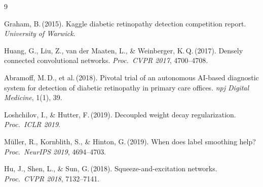 \documentclass[a4paper, 10pt, twocolumn]{article}
\begin{document}
\renewcommand{\refname}{\normalfont\bfseries\small\color{accent}References}
\begin{thebibliography}{9}
\small\setlength{\itemsep}{1pt}

Graham, B.\,(2015).
Kaggle diabetic retinopathy detection competition report.
\textit{University of Warwick}.

Huang, G., Liu, Z., van der Maaten, L., \& Weinberger, K.\,Q.\,(2017).
Densely connected convolutional networks.
\textit{Proc.\ CVPR 2017}, 4700--4708.

Abramoff, M.\,D., et al.\,(2018).
Pivotal trial of an autonomous AI-based diagnostic system for detection of
diabetic retinopathy in primary care offices.
\textit{npj Digital Medicine}, 1(1), 39.

Loshchilov, I., \& Hutter, F.\,(2019).
Decoupled weight decay regularization.
\textit{Proc.\ ICLR 2019}.

M\"uller, R., Kornblith, S., \& Hinton, G.\,(2019).
When does label smoothing help?
\textit{Proc.\ NeurIPS 2019}, 4694--4703.

Hu, J., Shen, L., \& Sun, G.\,(2018).
Squeeze-and-excitation networks.
\textit{Proc.\ CVPR 2018}, 7132--7141.

\end{thebibliography}
\end{document}
